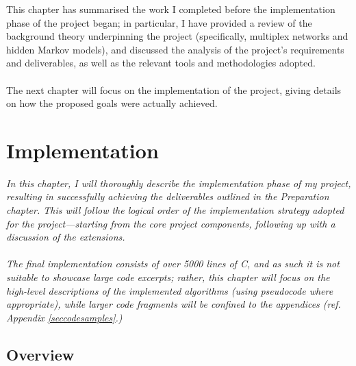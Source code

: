 \documentclass[12pt,a4paper,twoside,openright]{report}
\def\CC{{C\nolinebreak[4]\hspace{-.05em}\raisebox{.4ex}{\tiny\bf ++}}}
\begin{document}
This chapter has summarised the work I completed before the implementation phase of the project began; in particular, I have provided a review of the background theory underpinning the project (specifically, multiplex networks and hidden Markov models), and discussed the analysis of the project's requirements and deliverables, as well as the relevant tools and methodologies adopted.\\ \\
The next chapter will focus on the implementation of the project, giving details on how the proposed goals were actually achieved. 

\chapter{Implementation}

\emph{In this chapter, I will thoroughly describe the implementation phase of my project, resulting in successfully achieving the deliverables outlined in the Preparation chapter. This will follow the logical order of the implementation strategy adopted for the project---starting from the core project components, following up with a discussion of the extensions.\\ \\
The final implementation consists of over 5000 lines of \CC, and as such it is not suitable to showcase large code excerpts; rather, this chapter will focus on the high-level descriptions of the implemented algorithms (using pseudocode where appropriate), while larger code fragments will be confined to the appendices (ref. Appendix \ref{seccodesamples}.)}

\section{Overview}
\end{document}
